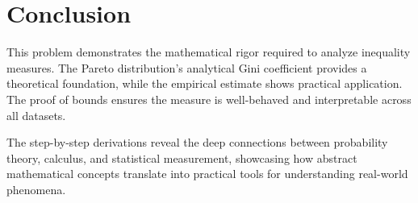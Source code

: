 \documentclass[12pt,a4paper]{article}
\theoremstyle{definition}
\begin{document}
\section*{Conclusion}

This problem demonstrates the mathematical rigor required to analyze inequality measures. The Pareto distribution's analytical Gini coefficient provides a theoretical foundation, while the empirical estimate shows practical application. The proof of bounds ensures the measure is well-behaved and interpretable across all datasets.

The step-by-step derivations reveal the deep connections between probability theory, calculus, and statistical measurement, showcasing how abstract mathematical concepts translate into practical tools for understanding real-world phenomena.
\end{document}
